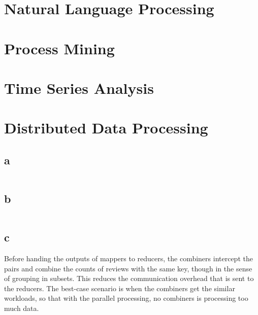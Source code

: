 \documentclass[12pt]{report}
\begin{document}
    \section{Natural Language Processing}
    \section{Process Mining}
    \section{Time Series Analysis}
    \section{Distributed Data Processing}
    	\subsection{a}
\inputminted[fontsize=\tiny]{python}{ distributed_data_processing/best_movies.py  }


    	\subsection{b}
\inputminted[fontsize=\tiny]{python}{ distributed_data_processing/haters.py  }

          \subsection{c}
          Before handing the outputs of mappers to reducers, the combiners intercept the pairs and combine the counts of reviews with the same key, though in the sense of grouping in subsets. This reduces the communication overhead that is sent to the reducers. The best-case scenario is when the combiners get the similar workloads, so that with the parallel processing, no combiners is processing too much data.
\end{document}
